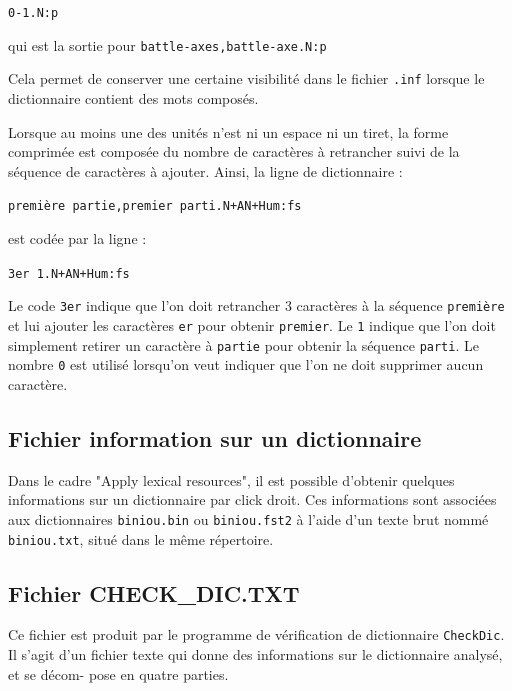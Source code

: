 \bigskip
\verb$0-1.N:p$

\bigskip
\noindent qui est la sortie pour \verb$battle-axes,battle-axe.N:p$

\bigskip
\noindent Cela permet de conserver une certaine visibilité dans le fichier \verb+.inf+ lorsque le dictionnaire contient des mots composés.


\bigskip
\noindent Lorsque au moins une des unités n’est ni un espace ni un tiret, la forme comprimée est
composée du nombre de caractères à retrancher suivi de la séquence de caractères à ajouter.
Ainsi, la ligne de dictionnaire :

\bigskip
\noindent
\texttt{premi\`ere partie,premier parti.N+AN+Hum:fs}

\bigskip
\noindent est codée par la ligne :

\bigskip
\verb$3er 1.N+AN+Hum:fs$

\bigskip
\noindent Le code \verb+3er+ indique que l’on doit retrancher 3 caractères à la séquence
\texttt{premi\`ere} et lui ajouter les caractères \verb+er+  pour obtenir \verb+premier+. Le 
\verb+1+ indique que l’on doit simplement retirer un caractère à \verb+partie+ pour obtenir la
séquence  \verb+parti+. Le nombre \verb+0+ est utilisé lorsqu’on veut indiquer que l’on ne doit
supprimer aucun caractère.


\subsection{Fichier information sur un dictionnaire}
Dans le cadre "Apply lexical resources", il est possible d'obtenir quelques informations sur
un dictionnaire par click droit. Ces informations sont associées aux dictionnaires \verb+biniou.bin+
ou \verb+biniou.fst2+ à l'aide d'un texte brut nommé \verb+biniou.txt+, situé dans le même
répertoire.

\subsection{Fichier CHECK\_DIC.TXT}
Ce fichier est produit par le programme de vérification de dictionnaire \verb+CheckDic+.                                                                                             Il s’agit d’un fichier texte qui donne des informations sur le dictionnaire analysé, et se décom-
pose en quatre parties.


